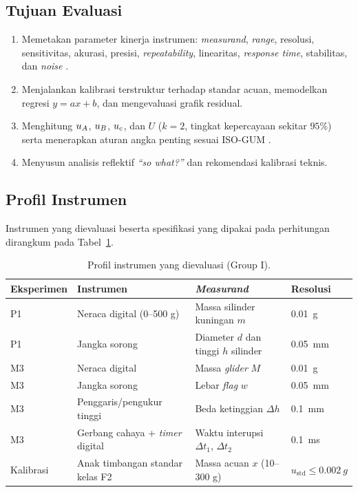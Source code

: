 \documentclass[a4paper, 12pt]{article}
\begin{document}
        \subsection{Tujuan Evaluasi}
        \begin{enumerate}
            \item Memetakan parameter kinerja instrumen: \textit{measurand}, \textit{range}, resolusi, sensitivitas, akurasi, presisi, \textit{repeatability}, linearitas, \textit{response time}, stabilitas, dan \textit{noise} \parencite{JCGM2012VIM}.
            \item Menjalankan kalibrasi terstruktur terhadap standar acuan, memodelkan regresi $y=ax+b$, dan mengevaluasi grafik residual.
            \item Menghitung $u_{A}$, $u_{B}$, $u_{c}$, dan $U$ ($k=2$, tingkat kepercayaan sekitar $95\%$) serta menerapkan aturan angka penting sesuai ISO-GUM \parencite{JCGM2008GUM}.
            \item Menyusun analisis reflektif \textit{``so what?''} dan rekomendasi kalibrasi teknis.
        \end{enumerate}

        \subsection{Profil Instrumen}
        Instrumen yang dievaluasi beserta spesifikasi yang dipakai pada perhitungan dirangkum pada Tabel~\ref{tab:profil}.
\begin{table}[H]
\centering
\singlespacing
\caption{Profil instrumen yang dievaluasi (Group I).}
\label{tab:profil}
\small
\begin{tabularx}{\textwidth}{@{}l l X l@{}}
\toprule
\textbf{Eksperimen} & \textbf{Instrumen} & \textbf{\textit{Measurand}} & \textbf{Resolusi}\\
\midrule
P1 & Neraca digital (0--500 g) & Massa silinder kuningan $m$ & \SI{0,01}{g}\\
P1 & Jangka sorong & Diameter $d$ dan tinggi $h$ silinder & \SI{0,05}{mm}\\
M3 & Neraca digital & Massa \textit{glider} $M$ & \SI{0,01}{g}\\
M3 & Jangka sorong & Lebar \textit{flag} $w$ & \SI{0,05}{mm}\\
M3 & Penggaris/pengukur tinggi & Beda ketinggian $\Delta h$ & \SI{0,1}{mm}\\
M3 & Gerbang cahaya + \textit{timer} digital & Waktu interupsi $\Delta t_1$, $\Delta t_2$ & \SI{0,1}{ms}\\
Kalibrasi & Anak timbangan standar kelas F2 & Massa acuan $x$ (10--300 g) & $u_{\mathrm{std}}\le\SI{0,002}{g}$\\
\bottomrule
\end{tabularx}
\end{table}
\end{document}
